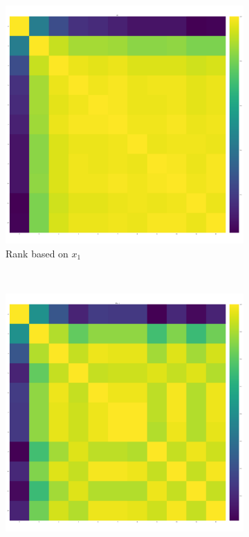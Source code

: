 \documentclass{article}
\begin{document}
\begin{figure}[!htbp]
	\centering
	\begin{subfigure}[t]{.3\textwidth}
		\centering
		\includegraphics[width=.9\textwidth]{./img/correlation_heatmap_invade.pdf}
		\caption{Rank based on \(x_1\)}
    \end{subfigure}
    ~
	\begin{subfigure}[t]{.3\textwidth}
		\centering
		\includegraphics[width=.9\textwidth]{./img/correlation_heatmap_resist.pdf}

\end{subfigure}
\end{figure}
\end{document}

